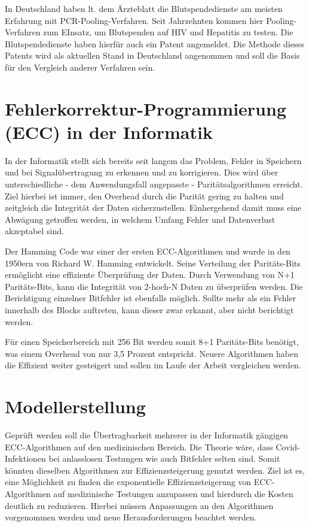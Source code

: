 In Deutschland haben lt. dem Ärzteblatt die Blutspendedienste am meisten Erfahrung mit PCR-Pooling-Verfahren. \cite{Ärzteblatt}
Seit Jahrzehnten kommen hier Pooling-Verfahren zum EInsatz, um Blutspenden auf HIV und Hepatitis zu testen.
Die Blutspendedienste haben hierfür auch ein Patent angemeldet. \cite{Patent Blutspende}
Die Methode dieses Patents wird als aktuellen Stand in Deutschland angenommen und soll die Basis für den Vergleich anderer Verfahren sein.

\section{Fehlerkorrektur-Programmierung (ECC) in der Informatik}
In der Informatik stellt sich bereits seit langem das Problem, Fehler in Speichern und bei Signalübertragung zu erkennen und zu korrigieren.
Dies wird über unterschiedliche - dem Anwendungsfall angepasste - Paritätsalgorithmen erreicht.
Ziel hierbei ist immer, den Overhead durch die Parität gering zu halten und zeitgleich die Integrität der Daten sicherzustellen.
Einhergehend damit muss eine Abwägung getroffen werden, in welchem Umfang Fehler und Datenverlust akzeptabel sind.

Der Hamming Code war einer der ersten ECC-Algorithmen und wurde in den 1950ern von Richard W. Hamming entwickelt.
Seine Verteilung der Paritäts-Bits ermöglicht eine effiziente Überprüfung der Daten.
Durch Verwendung von N+1 Paritäts-Bits, kann die Integrität von 2-hoch-N Daten zu überprüfen  werden.
Die Berichtigung einzelner Bitfehler ist ebenfalls möglich.
Sollte mehr als ein Fehler innerhalb des Blocks auftreten, kann dieser zwar erkannt, aber nicht berichtigt werden.

Für einen Speicherbereich mit 256 Bit werden somit 8+1 Paritäts-Bits benötigt, was einem Overhead von nur 3,5 Prozent entspricht.
Neuere Algorithmen haben die Effizient weiter gesteigert und sollen im Laufe der Arbeit vergleichen werden.

\section{Modellerstellung}
Geprüft werden soll die Übertragbarkeit mehrerer in der Informatik gängigen ECC-Algorithmen auf den medizinischen Bereich.
Die Theorie wäre, dass Covid-Infektionen bei anlasslosen Testungen wie auch Bitfehler selten sind.
Somit könnten dieselben Algorithmen zur Effizienzsteigerung genutzt werden.
Ziel ist es, eine Möglichkeit zu finden die exponentielle Effizienzsteigerung von ECC-Algorithmen auf medizinische Testungen anzupassen und hierdurch die Kosten deutlich zu reduzieren.
Hierbei müssen Anpassungen an den Algorithmen vorgenommen werden und neue Herausforderungen beachtet werden.

